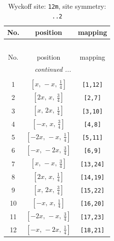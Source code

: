 \documentclass[fleqn,8pt]{jsarticle}
\begin{document}
\begin{longtable}{ccc}
\caption{Wyckoff site: {\tt 12m}, site symmetry: {\tt ..2}}
 \\
 \hline \hline
No. & position & mapping \\ \hline \endfirsthead

\multicolumn{2}{l}{\tablename\ \thetable{}} \\
 \hline \hline
No. & position & mapping \\ \hline \endhead

 \hline \hline
\multicolumn{2}{r}{\footnotesize\it continued ...} \\ \endfoot

 \hline \hline
\multicolumn{2}{r}{} \\ \endlastfoot

1 & $\left[ x,\, - x,\, \frac{1}{4} \right]$ & {\tt [1,12]} \\ \hline
2 & $\left[ 2 x,\, x,\, \frac{3}{4} \right]$ & {\tt [2,7]} \\ \hline
3 & $\left[ x,\, 2 x,\, \frac{1}{4} \right]$ & {\tt [3,10]} \\ \hline
4 & $\left[ - x,\, x,\, \frac{3}{4} \right]$ & {\tt [4,8]} \\ \hline
5 & $\left[ - 2 x,\, - x,\, \frac{1}{4} \right]$ & {\tt [5,11]} \\ \hline
6 & $\left[ - x,\, - 2 x,\, \frac{3}{4} \right]$ & {\tt [6,9]} \\ \hline
7 & $\left[ x,\, - x,\, \frac{3}{4} \right]$ & {\tt [13,24]} \\ \hline
8 & $\left[ 2 x,\, x,\, \frac{1}{4} \right]$ & {\tt [14,19]} \\ \hline
9 & $\left[ x,\, 2 x,\, \frac{3}{4} \right]$ & {\tt [15,22]} \\ \hline
10 & $\left[ - x,\, x,\, \frac{1}{4} \right]$ & {\tt [16,20]} \\ \hline
11 & $\left[ - 2 x,\, - x,\, \frac{3}{4} \right]$ & {\tt [17,23]} \\ \hline
12 & $\left[ - x,\, - 2 x,\, \frac{1}{4} \right]$ & {\tt [18,21]} \\
\end{longtable}
\renewcommand{\arraystretch}{1.2}
\end{document}
